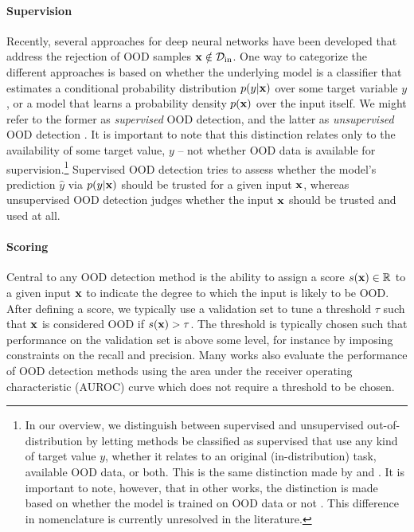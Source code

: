 \paragraph{Supervision} Recently, several approaches for deep neural networks have been developed that address the rejection of OOD samples ${\mathbf{x}}\notin\mathcal{D}_{\text{in}}$. 
One way to categorize the different approaches is based on whether the underlying model is a classifier that estimates a conditional probability distribution $p(y|{\mathbf{x}})$ over some target variable $y$, or a model that learns a probability density $p({\mathbf{x}})$ over the input itself. We might refer to the former as \emph{supervised} OOD detection, and the latter as \emph{unsupervised} OOD detection \parencite{graham_denoising_2023,liu_unsupervised_2023a}. It is important to note that this distinction relates only to the availability of some target value, $y$ -- not whether OOD data is available for supervision.\footnote{
    In our overview, we distinguish between supervised and unsupervised out-of-distribution by letting methods be classified as supervised that use any kind of target value $y$, whether it relates to an original (in-distribution) task, available OOD data, or both. This is the same distinction made by \textcite{graham_denoising_2023} and \textcite{liu_unsupervised_2023a}. 
    It is important to note, however, that in other works, the distinction is made based on whether the model is trained on OOD data or not \parencite{hendrycks_baseline_2017,liu_energybased_2020}. This difference in nomenclature is currently unresolved in the literature. 
} 
Supervised OOD detection tries to assess whether the model's prediction $\hat{y}$ via $p(y|{\mathbf{x}})$ should be trusted for a given input ${\mathbf{x}}$, whereas unsupervised OOD detection judges whether the input ${\mathbf{x}}$ should be trusted and used at all. 

\paragraph{Scoring} Central to any OOD detection method is the ability to assign a score $s({\mathbf{x}}) \in \mathbb{R}$ to a given input ${\mathbf{x}}$ to indicate the degree to which the input is likely to be OOD. After defining a score, we typically use a validation set to tune a threshold $\tau$ such that ${\mathbf{x}}$ is considered OOD if $s({\mathbf{x}}) > \tau$. The threshold is typically chosen such that performance on the validation set is above some level, for instance by imposing constraints on the recall and precision. Many works also evaluate the performance of OOD detection methods using the area under the receiver operating characteristic (AUROC) curve which does not require a threshold to be chosen.

